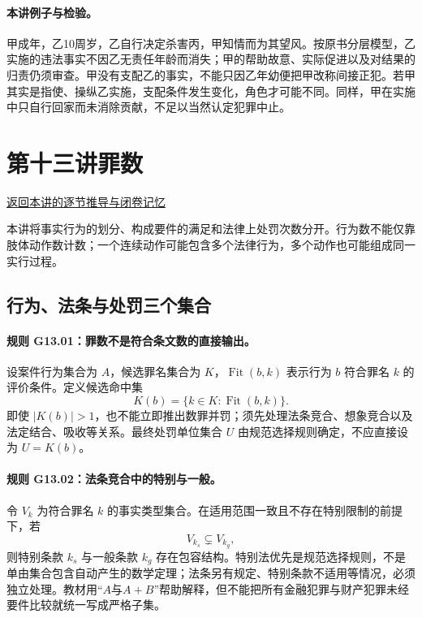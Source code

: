 \paragraph{本讲例子与检验。}
甲成年，乙10周岁，乙自行决定杀害丙，甲知情而为其望风。按原书分层模型，乙实施的违法事实不因乙无责任年龄而消失；甲的帮助故意、实际促进以及对结果的归责仍须审查。甲没有支配乙的事实，不能只因乙年幼便把甲改称间接正犯。若甲其实是指使、操纵乙实施，支配条件发生变化，角色才可能不同。同样，甲在实施中只自行回家而未消除贡献，不足以当然认定犯罪中止。

\section{第十三讲\quad 罪数}

\label{ref:lecture:13}

\noindent\hyperref[lecture:13]{返回本讲的逐节推导与闭卷记忆}

本讲将事实行为的划分、构成要件的满足和法律上处罚次数分开。行为数不能仅靠肢体动作数计数；一个连续动作可能包含多个法律行为，多个动作也可能组成同一实行过程。

\subsection{行为、法条与处罚三个集合}
\paragraph{规则 G13.01：罪数不是符合条文数的直接输出。}
设案件行为集合为 $A$，候选罪名集合为 $K$，$\operatorname{Fit}(b,k)$ 表示行为 $b$ 符合罪名 $k$ 的评价条件。定义候选命中集
\[
K(b)=\{k\in K:\operatorname{Fit}(b,k)\}.
\]
即使 $|K(b)|>1$，也不能立即推出数罪并罚；须先处理法条竞合、想象竞合以及法定结合、吸收等关系。最终处罚单位集合 $U$ 由规范选择规则确定，不应直接设为 $U=K(b)$。

\paragraph{规则 G13.02：法条竞合中的特别与一般。}
令 $V_k$ 为符合罪名 $k$ 的事实类型集合。在适用范围一致且不存在特别限制的前提下，若
\[
V_{k_s}\subsetneq V_{k_g},
\]
则特别条款 $k_s$ 与一般条款 $k_g$ 存在包容结构。特别法优先是规范选择规则，不是单由集合包含自动产生的数学定理；法条另有规定、特别条款不适用等情况，必须独立处理。教材用“$A$与$A+B$”帮助解释，但不能把所有金融犯罪与财产犯罪未经要件比较就统一写成严格子集。

